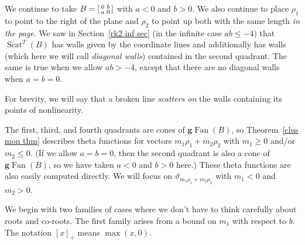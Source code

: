 \documentclass[ALCO,ThmDefs,Unicode,epreuves]{cedram}
\DeclareMathOperator{\Scat}{Scat}
\DeclareMathOperator{\Fan}{Fan}
\newcommand{\gFan}{\g\!\Fan}
\newcommand{\newword}[1]{\emph{#1}}
\newcommand{\thet}{\vartheta}
\newcommand{\g}{\mathbf{g}}
\renewcommand{\a}{\mathbf{a}}
\begin{document}
We continue to take $B=\begin{bsmallmatrix}0&b\\a&0\end{bsmallmatrix}$ with $a<0$ and $b>0$.
We also continue to place $\rho_1$ to point to the right of the plane and $\rho_2$ to point up both with the same length \emph{in the page}.
We saw in Section~\ref{rk2 inf sec} (in the infinite case $ab\le-4$) that $\Scat^T(B)$ has walls given by the coordinate lines and additionally has walls (which here we will call \newword{diagonal walls}) contained in the second quadrant.
The same is true when we allow $ab>-4$, except that there are no diagonal walls when $a=b=0$.

For brevity, we will say that a broken line \newword{scatters on} the walls containing its points of nonlinearity.

The first, third, and fourth quadrants are cones of $\gFan(B)$, so Theorem~\ref{clus mon thm} describes theta functions for vectors $m_1\rho_1+m_2\rho_2$ with $m_1\ge0$ and/or $m_2\le0$.
(If we allow $a=b=0$, then the second quadrant is also a cone of $\gFan(B)$, so we have taken $a<0$ and $b>0$ here.)
These theta functions are also easily computed directly.
We will focus on $\thet_{m_1\rho_1+m_2\rho_2}$ with $m_1<0$ and $m_2>0$.

We begin with two families of cases where we don't have to think carefully about roots and co-roots.
The first family arises from a bound on $m_1$ with respect to $b$.
The notation $[x]_+$ means $\max(x,0)$.
\end{document}
